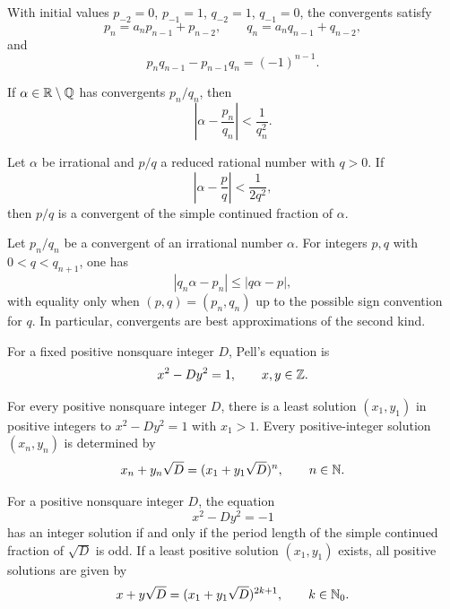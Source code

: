 \begin{proposition}
With initial values $p_{-2}=0$, $p_{-1}=1$, $q_{-2}=1$, $q_{-1}=0$, the convergents satisfy
\[
 p_n=a_np_{n-1}+p_{n-2}, \qquad
 q_n=a_nq_{n-1}+q_{n-2},
\]
and
\[
 p_nq_{n-1}-p_{n-1}q_n=(-1)^{n-1}.
\]
\end{proposition}

\begin{theorem}
If $\alpha\in\mathbb{R}\setminus\mathbb{Q}$ has convergents $p_n/q_n$, then
\[
 \left|\alpha-\frac{p_n}{q_n}\right|<\frac1{q_n^2}.
\]
\end{theorem}

\begin{theorem}
Let $\alpha$ be irrational and $p/q$ a reduced rational number with $q>0$. If
\[
 \left|\alpha-\frac pq\right|<\frac1{2q^2},
\]
then $p/q$ is a convergent of the simple continued fraction of $\alpha$.
\end{theorem}

\begin{theorem}
Let $p_n/q_n$ be a convergent of an irrational number $\alpha$. For integers $p,q$ with $0<q<q_{n+1}$, one has
\[
 |q_n\alpha-p_n|\le |q\alpha-p|,
\]
with equality only when $(p,q)=(p_n,q_n)$ up to the possible sign convention for $q$. In particular, convergents are best approximations of the second kind.
\end{theorem}

\begin{definition}
For a fixed positive nonsquare integer $D$, Pell's equation is
\[
 x^2-Dy^2=1, \qquad x, y\in\mathbb{Z}.
\]
\end{definition}

\begin{theorem}
For every positive nonsquare integer $D$, there is a least solution $(x_1, y_1)$ in positive integers to $x^2-Dy^2=1$ with $x_1>1$. Every positive-integer solution $(x_n, y_n)$ is determined by
\[
 x_n+y_n\sqrt D=(x_1+y_1\sqrt D)^n,
 \qquad n\in\mathbb{N}.
\]
\end{theorem}

\begin{theorem}
For a positive nonsquare integer $D$, the equation
\[
 x^2-Dy^2=-1
\]
has an integer solution if and only if the period length of the simple continued fraction of $\sqrt D$ is odd. If a least positive solution $(x_1,y_1)$ exists, all positive solutions are given by
\[
 x+y\sqrt D=(x_1+y_1\sqrt D)^{2k+1},\qquad k\in\mathbb{N}_0.
\]
\end{theorem}


